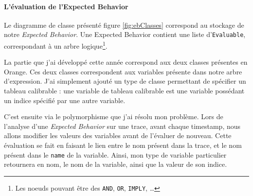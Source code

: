\paragraph{L'évaluation de l'Expected Behavior}

Le diagramme de classe présenté figure \ref{fig:ebClasses} correspond au stockage de notre \textit{Expected Behavior}. Une Expected Behavior contient une liste d'\texttt{Evaluable}, correspondant à un arbre logique\footnote{Les noeuds pouvant être des \texttt{AND}, \texttt{OR}, \texttt{IMPLY}, \ldots}. 

La partie que j'ai développé cette année correspond aux deux classes présentes en Orange. Ces deux classes correspondent aux variables présente dans notre arbre d'expression. J'ai simplement ajouté un type de classe permettant de spécifier un tableau calibrable : une variable de tableau calibrable est une variable possédant un indice spécifié par une autre variable.

C'est ensuite via le polymorphisme que j'ai résolu mon problème. Lors de l'analyse d'une \textit{Expected Behavior} sur une trace, avant chaque timestamp, nous allons modifier les valeurs des variables avant de l'évaluer de nouveau. Cette évaluation se fait en faisant le lien entre le nom présent dans la trace, et le nom présent dans le \texttt{name} de la variable. Ainsi, mon type de variable particulier retournera en nom, le nom de la variable, ainsi que la valeur de son indice.

